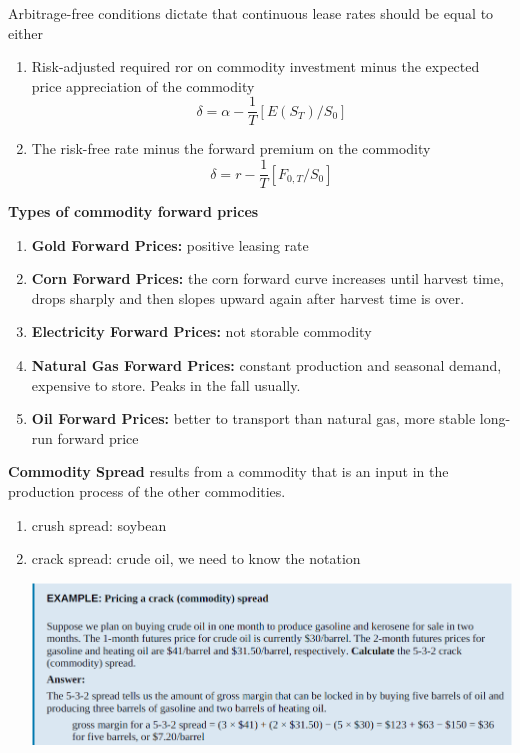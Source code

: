 \documentclass[11pt,fleqn]{book} %
\numberwithin{equation}{section} %
\numberwithin{figure}{section} %
\numberwithin{table}{section} %
\begin{document}
 \begin{remark}Arbitrage-free conditions dictate that continuous lease rates should be equal to either
 
 \begin{enumerate}
     \item Risk-adjusted required ror on commodity investment minus the expected price appreciation of the commodity
     $$
     \delta=\alpha-\frac{1}{T}[E(S_T)/S_0]
     $$
     \item The risk-free rate minus the forward premium on the commodity
     $$
     \delta=r-\frac{1}{T}[F_{0,T}/S_0]
     $$
 \end{enumerate}
  \end{remark}
 \begin{definition}\textbf{Types of commodity forward prices}
 \begin{enumerate}
     \item \textbf{Gold Forward Prices:} positive leasing rate
     \item \textbf{Corn Forward Prices:} the corn forward curve increases until harvest time, drops sharply and then slopes upward again after harvest time is over.
     \item \textbf{Electricity Forward Prices:} not storable commodity
     \item \textbf{Natural Gas Forward Prices:} constant production and seasonal demand, expensive to store. Peaks in the fall usually.
     \item \textbf{Oil Forward Prices:} better to transport than natural gas, more stable long-run forward price
 \end{enumerate}
 \end{definition}
\begin{definition}\textbf{Commodity Spread} results from a commodity that is an input in the production process of the other commodities.
\begin{enumerate}
    \item crush spread: soybean
    \item crack spread: crude oil, we need to know the notation
    \begin{center}
        \includegraphics[scale=0.5]{gasoline.PNG}
    \end{center}
\end{enumerate}
\end{definition}
\end{document}
